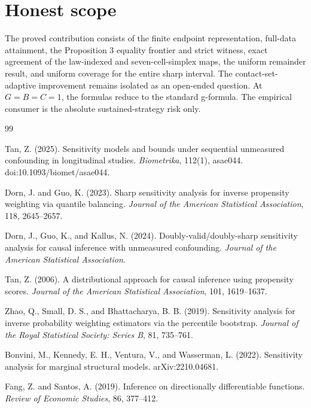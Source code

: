 \documentclass{article}
\begin{document}
\section{Honest scope}

The proved contribution consists of the finite endpoint representation, full-data attainment, the Proposition 3 equality frontier and strict witness, exact agreement of the law-indexed and seven-cell-simplex maps, the uniform remainder result, and uniform coverage for the entire sharp interval. The contact-set-adaptive improvement remains isolated as an open-ended question. At \(G=B=C=1\), the formulas reduce to the standard g-formula. The empirical consumer is the absolute sustained-strategy risk only.

\begin{thebibliography}{99}

   Tan, Z. (2025). Sensitivity models and bounds under sequential unmeasured confounding in longitudinal studies. \emph{Biometrika}, 112(1), asae044. doi:10.1093/biomet/asae044.

   Dorn, J. and Guo, K. (2023). Sharp sensitivity analysis for inverse propensity weighting via quantile balancing. \emph{Journal of the American Statistical Association}, 118, 2645--2657.

   Dorn, J., Guo, K., and Kallus, N. (2024). Doubly-valid/doubly-sharp sensitivity analysis for causal inference with unmeasured confounding. \emph{Journal of the American Statistical Association}.

   Tan, Z. (2006). A distributional approach for causal inference using propensity scores. \emph{Journal of the American Statistical Association}, 101, 1619--1637.

   Zhao, Q., Small, D. S., and Bhattacharya, B. B. (2019). Sensitivity analysis for inverse probability weighting estimators via the percentile bootstrap. \emph{Journal of the Royal Statistical Society: Series B}, 81, 735--761.

   Bonvini, M., Kennedy, E. H., Ventura, V., and Wasserman, L. (2022). Sensitivity analysis for marginal structural models. arXiv:2210.04681.

   Fang, Z. and Santos, A. (2019). Inference on directionally differentiable functions. \emph{Review of Economic Studies}, 86, 377--412.


\end{thebibliography}
\end{document}
